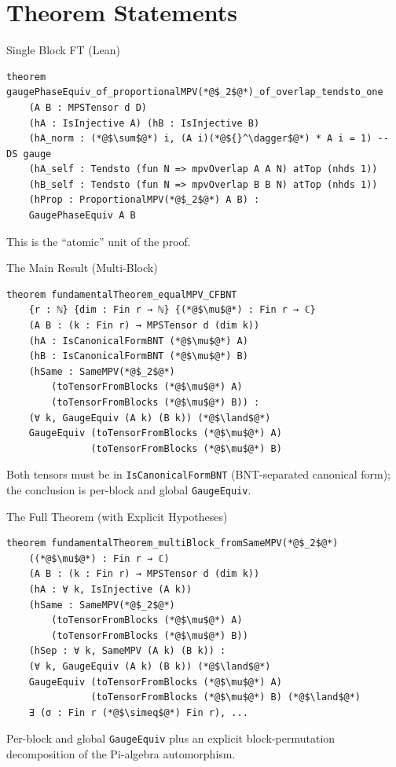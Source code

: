 \documentclass[aspectratio=169,10pt]{beamer}
\begin{document}
\section{Theorem Statements}

\begin{frame}[fragile]{Single Block FT (Lean)}
    \begin{lstlisting}[language=Lean]
theorem gaugePhaseEquiv_of_proportionalMPV(*@$_2$@*)_of_overlap_tendsto_one
    (A B : MPSTensor d D)
    (hA : IsInjective A) (hB : IsInjective B)
    (hA_norm : (*@$\sum$@*) i, (A i)(*@${}^\dagger$@*) * A i = 1) -- DS gauge
    (hA_self : Tendsto (fun N => mpvOverlap A A N) atTop (nhds 1))
    (hB_self : Tendsto (fun N => mpvOverlap B B N) atTop (nhds 1))
    (hProp : ProportionalMPV(*@$_2$@*) A B) :
    GaugePhaseEquiv A B
    \end{lstlisting}
    
    This is the ``atomic'' unit of the proof.
\end{frame}

\begin{frame}[fragile]{The Main Result (Multi-Block)}
    \footnotesize
    \begin{lstlisting}[language=Lean,basicstyle=\ttfamily\tiny\color{white}]
theorem fundamentalTheorem_equalMPV_CFBNT
    {r : ℕ} {dim : Fin r → ℕ} {(*@$\mu$@*) : Fin r → ℂ}
    (A B : (k : Fin r) → MPSTensor d (dim k))
    (hA : IsCanonicalFormBNT (*@$\mu$@*) A)
    (hB : IsCanonicalFormBNT (*@$\mu$@*) B)
    (hSame : SameMPV(*@$_2$@*)
        (toTensorFromBlocks (*@$\mu$@*) A)
        (toTensorFromBlocks (*@$\mu$@*) B)) :
    (∀ k, GaugeEquiv (A k) (B k)) (*@$\land$@*)
    GaugeEquiv (toTensorFromBlocks (*@$\mu$@*) A)
               (toTensorFromBlocks (*@$\mu$@*) B)
    \end{lstlisting}
    
    Both tensors must be in \texttt{IsCanonicalFormBNT} (BNT-separated canonical form);
    the conclusion is per-block and global \texttt{GaugeEquiv}.
\end{frame}

\begin{frame}[fragile]{The Full Theorem (with Explicit Hypotheses)}
    \footnotesize
    \begin{lstlisting}[language=Lean,basicstyle=\ttfamily\tiny\color{white}]
theorem fundamentalTheorem_multiBlock_fromSameMPV(*@$_2$@*)
    ((*@$\mu$@*) : Fin r → ℂ)
    (A B : (k : Fin r) → MPSTensor d (dim k))
    (hA : ∀ k, IsInjective (A k))
    (hSame : SameMPV(*@$_2$@*)
        (toTensorFromBlocks (*@$\mu$@*) A)
        (toTensorFromBlocks (*@$\mu$@*) B))
    (hSep : ∀ k, SameMPV (A k) (B k)) :
    (∀ k, GaugeEquiv (A k) (B k)) (*@$\land$@*)
    GaugeEquiv (toTensorFromBlocks (*@$\mu$@*) A)
               (toTensorFromBlocks (*@$\mu$@*) B) (*@$\land$@*)
    ∃ (σ : Fin r (*@$\simeq$@*) Fin r), ...
    \end{lstlisting}

    Per-block and global \texttt{GaugeEquiv} plus an explicit block-permutation
    decomposition of the Pi-algebra automorphism.
\end{frame}
\end{document}
